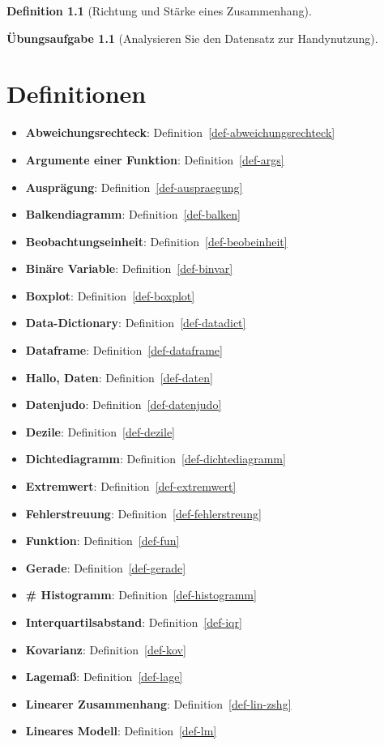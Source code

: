 \documentclass[
  a4paper,
  DIV=11]{scrreprt}
\theoremstyle{definition}
\newtheorem{exercise}{Übungsaufgabe}[chapter]
\theoremstyle{definition}
\theoremstyle{definition}
\newtheorem{definition}{Definition}[chapter]
\theoremstyle{remark}
\begin{document}
\begin{definition}[Richtung und Stärke eines
Zusammenhang]
\begin{exercise}[Analysieren Sie den Datensatz zur
Handynutzung]
\chapter{Definitionen}\label{definitionen}

\begin{itemize}
\item
  \textbf{Abweichungsrechteck}: Definition~\ref{def-abweichungsrechteck}
\item
  \textbf{Argumente einer Funktion}: Definition~\ref{def-args}
\item
  \textbf{Ausprägung}: Definition~\ref{def-auspraegung}
\item
  \textbf{Balkendiagramm}: Definition~\ref{def-balken}
\item
  \textbf{Beobachtungseinheit}: Definition~\ref{def-beobeinheit}
\item
  \textbf{Binäre Variable}: Definition~\ref{def-binvar}
\item
  \textbf{Boxplot}: Definition~\ref{def-boxplot}
\item
  \textbf{Data-Dictionary}: Definition~\ref{def-datadict}
\item
  \textbf{Dataframe}: Definition~\ref{def-dataframe}
\item
  \textbf{Hallo, Daten}: Definition~\ref{def-daten}
\item
  \textbf{Datenjudo}: Definition~\ref{def-datenjudo}
\item
  \textbf{Dezile}: Definition~\ref{def-dezile}
\item
  \textbf{Dichtediagramm}: Definition~\ref{def-dichtediagramm}
\item
  \textbf{Extremwert}: Definition~\ref{def-extremwert}
\item
  \textbf{Fehlerstreuung}: Definition~\ref{def-fehlerstreung}
\item
  \textbf{Funktion}: Definition~\ref{def-fun}
\item
  \textbf{Gerade}: Definition~\ref{def-gerade}
\item
  \textbf{\# Histogramm}: Definition~\ref{def-histogramm}
\item
  \textbf{Interquartilsabstand}: Definition~\ref{def-iqr}
\item
  \textbf{Kovarianz}: Definition~\ref{def-kov}
\item
  \textbf{Lagemaß}: Definition~\ref{def-lage}
\item
  \textbf{Linearer Zusammenhang}: Definition~\ref{def-lin-zshg}
\item
  \textbf{Lineares Modell}: Definition~\ref{def-lm}

\end{itemize}
\end{exercise}
\end{definition}
\end{document}
